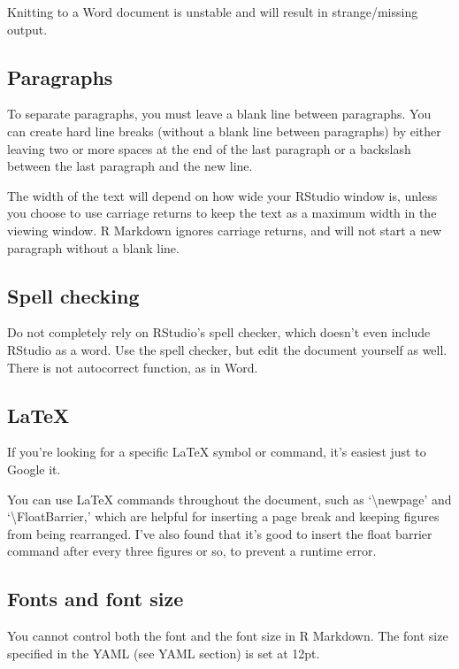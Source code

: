 \documentclass[12pt,]{article}
\begin{document}
Knitting to a Word document is unstable and will result in
strange/missing output.

\subsection{Paragraphs}\label{paragraphs}

To separate paragraphs, you must leave a blank line between paragraphs.
You can create hard line breaks (without a blank line between
paragraphs) by either leaving two or more spaces at the end of the last
paragraph or a backslash between the last paragraph and the new line.

The width of the text will depend on how wide your RStudio window is,
unless you choose to use carriage returns to keep the text as a maximum
width in the viewing window. R Markdown ignores carriage returns, and
will not start a new paragraph without a blank line.

\subsection{Spell checking}\label{spell-checking}

Do not completely rely on RStudio's spell checker, which doesn't even
include RStudio as a word. Use the spell checker, but edit the document
yourself as well. There is not autocorrect function, as in Word.

\subsection{LaTeX}\label{latex}

If you're looking for a specific LaTeX symbol or command, it's easiest
just to Google it.

You can use LaTeX commands throughout the document, such as
`\textbackslash{}newpage' and `\textbackslash{}FloatBarrier,' which are
helpful for inserting a page break and keeping figures from being
rearranged. I've also found that it's good to insert the float barrier
command after every three figures or so, to prevent a runtime error.

\subsection{Fonts and font size}\label{fonts-and-font-size}

You cannot control both the font and the font size in R Markdown. The
font size specified in the YAML (see YAML section) is set at 12pt.
\end{document}
